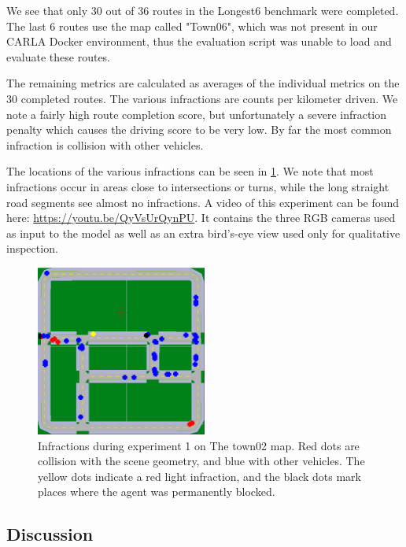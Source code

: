 We see that only 30 out of 36 routes in the Longest6 benchmark were completed.
The last 6 routes use the map called "Town06",
which was not present in our CARLA Docker environment,
thus the evaluation script was unable to load and evaluate these routes.

The remaining metrics are calculated as averages of the 
individual metrics on the 30 completed routes.
The various infractions are counts per kilometer driven.
We note a fairly high route completion score,
but unfortunately a severe infraction penalty
which causes the driving score to be very low.
By far the most common infraction is collision with other vehicles.

The locations of the various infractions can be seen in \cref{fig:exp1:town02}.
We note that most infractions occur in areas close to intersections or turns,
while the long straight road segments see almost no infractions.
A video of this experiment can be found here: \url{https://youtu.be/QyVsUrQynPU}. It contains the three
RGB cameras used as input to the model as well as an extra bird's-eye view used 
only for qualitative inspection.

\begin{figure}
    \centering
    \includegraphics[width=0.5\textwidth]{chapters/4-experiments-results/figures/exp1-Town02.png}
    \caption{Infractions during experiment 1 on The town02 map.
    Red dots are collision with the scene geometry,
    and blue with other vehicles.
    The yellow dots indicate a red light infraction,
    and the black dots mark places where the agent was permanently blocked.}
    \label{fig:exp1:town02}
\end{figure}


\subsection{Discussion}

